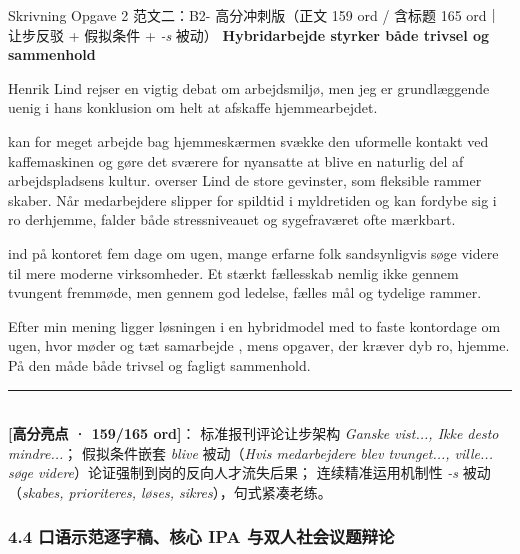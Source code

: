\begin{emailbox}{Skrivning Opgave 2 范文二：B2- 高分冲刺版（正文 159 ord / 含标题 165 ord｜让步反驳 + 假拟条件 + \textit{-s} 被动）}
\textbf{\color{NCDNavy}Hybridarbejde styrker både trivsel og sammenhold}

\vspace{0.25em}
Henrik Lind rejser en vigtig debat om arbejdsmiljø, men jeg er grundlæggende uenig i hans konklusion om helt at afskaffe hjemmearbejdet.

\vspace{0.25em}
 kan for meget arbejde bag hjemmeskærmen svække den uformelle kontakt ved kaffemaskinen og gøre det sværere for nyansatte at blive en naturlig del af arbejdspladsens kultur.  overser Lind de store gevinster, som fleksible rammer skaber. Når medarbejdere slipper for spildtid i myldretiden og kan fordybe sig i ro derhjemme, falder både stressniveauet og sygefraværet ofte mærkbart.

\vspace{0.25em}
 ind på kontoret fem dage om ugen,  mange erfarne folk sandsynligvis søge videre til mere moderne virksomheder. Et stærkt fællesskab  nemlig ikke gennem tvungent fremmøde, men gennem god ledelse, fælles mål og tydelige rammer.

\vspace{0.25em}
Efter min mening ligger løsningen i en hybridmodel med to faste kontordage om ugen, hvor møder og tæt samarbejde , mens opgaver, der kræver dyb ro,  hjemme. På den måde  både trivsel og fagligt sammenhold.

\vspace{0.3em}
\rule{\linewidth}{0.4pt}\\[0.2em]
\small\textbf{\color{NCDNavy}[高分亮点 · 159/165 ord]}： 标准报刊评论让步架构 \textit{Ganske vist..., Ikke desto mindre...}； 假拟条件嵌套 \textit{blive} 被动（\textit{Hvis medarbejdere blev tvunget..., ville... søge videre}）论证强制到岗的反向人才流失后果； 连续精准运用机制性 \textit{-s} 被动（\textit{skabes, prioriteres, løses, sikres}），句式紧凑老练。
\end{emailbox}

\subsubsection*{4.4 口语示范逐字稿、核心 IPA 与双人社会议题辩论}

